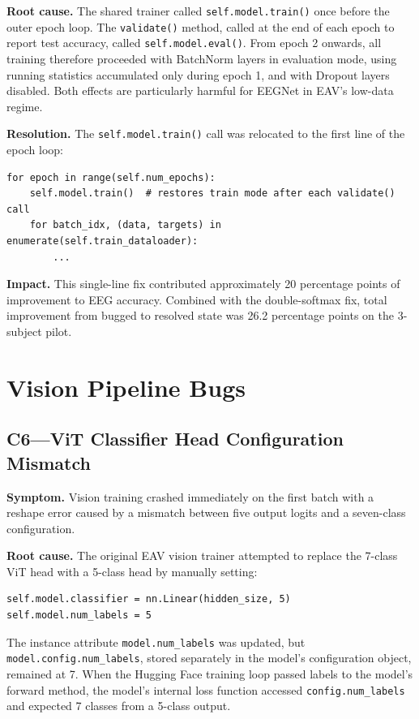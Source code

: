 \textbf{Root cause.} The shared trainer called \texttt{self.model.train()} once before the outer epoch loop. The \texttt{validate()} method, called at the end of each epoch to report test accuracy, called \texttt{self.model.eval()}. From epoch 2 onwards, all training therefore proceeded with BatchNorm layers in evaluation mode, using running statistics accumulated only during epoch 1, and with Dropout layers disabled. Both effects are particularly harmful for EEGNet in EAV's low-data regime.

\textbf{Resolution.} The \texttt{self.model.train()} call was relocated to the first line of the epoch loop:

\begin{verbatim}
for epoch in range(self.num_epochs):
    self.model.train()  # restores train mode after each validate() call
    for batch_idx, (data, targets) in enumerate(self.train_dataloader):
        ...
\end{verbatim}

\textbf{Impact.} This single-line fix contributed approximately 20 percentage points of improvement to EEG accuracy. Combined with the double-softmax fix, total improvement from bugged to resolved state was 26.2 percentage points on the 3-subject pilot.

\section{Vision Pipeline Bugs}
\subsection*{C6---ViT Classifier Head Configuration Mismatch}
\textbf{Symptom.} Vision training crashed immediately on the first batch with a reshape error caused by a mismatch between five output logits and a seven-class configuration.

\textbf{Root cause.} The original EAV vision trainer attempted to replace the 7-class ViT head with a 5-class head by manually setting:

\begin{verbatim}
self.model.classifier = nn.Linear(hidden_size, 5)
self.model.num_labels = 5
\end{verbatim}

The instance attribute \texttt{model.num\_labels} was updated, but \texttt{model.config.num\_labels}, stored separately in the model's configuration object, remained at 7. When the Hugging Face training loop passed labels to the model's forward method, the model's internal loss function accessed \texttt{config.num\_labels} and expected 7 classes from a 5-class output.

